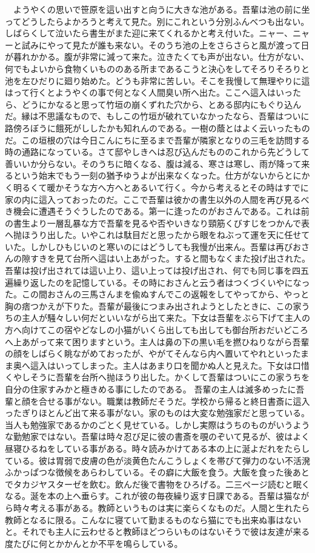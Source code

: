 \documentclass[main.tex]{subfiles}
\begin{document}
　ようやくの思いで笹原を這い出すと向うに大きな池がある。吾輩は池の前に坐ってどうしたらよかろうと考えて見た。別にこれという分別ふんべつも出ない。しばらくして泣いたら書生がまた迎に来てくれるかと考え付いた。ニャー、ニャーと試みにやって見たが誰も来ない。そのうち池の上をさらさらと風が渡って日が暮れかかる。腹が非常に減って来た。泣きたくても声が出ない。仕方がない、何でもよいから食物くいもののある所まであるこうと決心をしてそろりそろりと池を左ひだりに廻り始めた。どうも非常に苦しい。そこを我慢して無理やりに這はって行くとようやくの事で何となく人間臭い所へ出た。ここへ這入はいったら、どうにかなると思って竹垣の崩くずれた穴から、とある邸内にもぐり込んだ。縁は不思議なもので、もしこの竹垣が破れていなかったなら、吾輩はついに路傍ろぼうに餓死がししたかも知れんのである。一樹の蔭とはよく云いったものだ。この垣根の穴は今日こんにちに至るまで吾輩が隣家となりの三毛を訪問する時の通路になっている。さて邸やしきへは忍び込んだもののこれから先どうして善いいか分らない。そのうちに暗くなる、腹は減る、寒さは寒し、雨が降って来るという始末でもう一刻の猶予ゆうよが出来なくなった。仕方がないからとにかく明るくて暖かそうな方へ方へとあるいて行く。今から考えるとその時はすでに家の内に這入っておったのだ。ここで吾輩は彼かの書生以外の人間を再び見るべき機会に遭遇そうぐうしたのである。第一に逢ったのがおさんである。これは前の書生より一層乱暴な方で吾輩を見るや否やいきなり頸筋くびすじをつかんで表へ抛ほうり出した。いやこれは駄目だと思ったから眼をねぶって運を天に任せていた。しかしひもじいのと寒いのにはどうしても我慢が出来ん。吾輩は再びおさんの隙すきを見て台所へ這はい上あがった。すると間もなくまた投げ出された。吾輩は投げ出されては這い上り、這い上っては投げ出され、何でも同じ事を四五遍繰り返したのを記憶している。その時におさんと云う者はつくづくいやになった。この間おさんの三馬さんまを偸ぬすんでこの返報をしてやってから、やっと胸の痞つかえが下りた。吾輩が最後につまみ出されようとしたときに、この家うちの主人が騒々しい何だといいながら出て来た。下女は吾輩をぶら下げて主人の方へ向けてこの宿やどなしの小猫がいくら出しても出しても御台所おだいどころへ上あがって来て困りますという。主人は鼻の下の黒い毛を撚ひねりながら吾輩の顔をしばらく眺ながめておったが、やがてそんなら内へ置いてやれといったまま奥へ這入はいってしまった。主人はあまり口を聞かぬ人と見えた。下女は口惜くやしそうに吾輩を台所へ抛ほうり出した。かくして吾輩はついにこの家うちを自分の住家すみかと極きめる事にしたのである。
吾輩の主人は滅多めったに吾輩と顔を合せる事がない。職業は教師だそうだ。学校から帰ると終日書斎に這入ったぎりほとんど出て来る事がない。家のものは大変な勉強家だと思っている。当人も勉強家であるかのごとく見せている。しかし実際はうちのものがいうような勤勉家ではない。吾輩は時々忍び足に彼の書斎を覗のぞいて見るが、彼はよく昼寝ひるねをしている事がある。時々読みかけてある本の上に涎よだれをたらしている。彼は胃弱で皮膚の色が淡黄色たんこうしょくを帯びて弾力のない不活溌ふかっぱつな徴候をあらわしている。その癖に大飯を食う。大飯を食った後あとでタカジヤスターゼを飲む。飲んだ後で書物をひろげる。二三ページ読むと眠くなる。涎を本の上へ垂らす。これが彼の毎夜繰り返す日課である。吾輩は猫ながら時々考える事がある。教師というものは実に楽らくなものだ。人間と生れたら教師となるに限る。こんなに寝ていて勤まるものなら猫にでも出来ぬ事はないと。それでも主人に云わせると教師ほどつらいものはないそうで彼は友達が来る度たびに何とかかんとか不平を鳴らしている。
\clearpage
\end{document}
